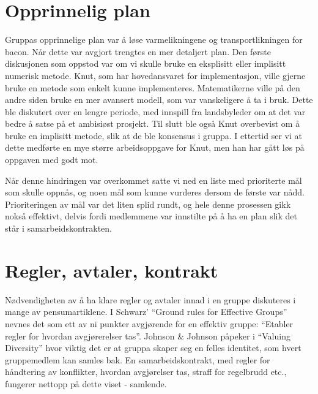 \section{Opprinnelig plan}
Gruppas opprinnelige plan var å løse varmelikningene og transportlikningen for
bacon. Når dette var avgjort trengtes en mer detaljert plan. Den første
diskusjonen som oppstod var om vi skulle bruke en eksplisitt eller implisitt
numerisk metode. Knut, som har hovedansvaret for implementasjon, ville gjerne
bruke en metode som enkelt kunne implementeres. Matematikerne ville
på den andre siden bruke en mer avansert modell, som var vanskeligere å ta i
bruk. Dette ble diskutert over en lengre periode, med innspill fra landsbyleder
om at det var bedre å satse på et ambisiøst prosjekt. Til slutt ble også Knut
overbevist om å bruke en implisitt metode, slik at de ble konsensus i gruppa. I
ettertid ser vi at dette medførte en mye større arbeidsoppgave for Knut, men han
har gått løs på oppgaven med godt mot. 

Når denne hindringen var overkommet satte vi ned en liste med prioriterte mål
som skulle oppnås, og noen mål som kunne vurderes dersom de første var
nådd. Prioriteringen av mål var det liten splid rundt, og hele denne prosessen
gikk nokså effektivt, delvis fordi medlemmene var innstilte på å ha en plan slik
det står i samarbeidskontrakten. 

\section{Regler, avtaler, kontrakt}
\label{sec:kontrakt}
Nødvendigheten av å ha klare regler og avtaler innad i en gruppe diskuteres i
mange av pensumartiklene. I Schwarz' ``Ground rules for Effective Groups''
\cite{schwarz} nevnes det som ett av ni punkter avgjørende for en effektiv
gruppe: ``Etabler regler for hvordan avgjørerelser
tas''. Johnson \& Johnson påpeker i ``Valuing Diversity'' \cite{jj} hvor viktig det er at gruppa skaper seg en felles
identitet, som hvert gruppemedlem kan samles bak. En samarbeidskontrakt, med
regler for håndtering av konflikter, hvordan avgjørelser tas, straff for
regelbrudd etc., fungerer nettopp på dette viset -
samlende. 


